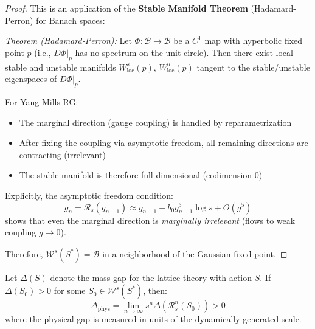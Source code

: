 \begin{proof}
This is an application of the \textbf{Stable Manifold Theorem} (Hadamard-Perron) 
for Banach spaces:

\textit{Theorem (Hadamard-Perron):} Let $\Phi: \mathcal{B} \to \mathcal{B}$ be 
a $C^1$ map with hyperbolic fixed point $p$ (i.e., $D\Phi|_p$ has no spectrum 
on the unit circle). Then there exist local stable and unstable manifolds 
$W^s_{\text{loc}}(p)$, $W^u_{\text{loc}}(p)$ tangent to the stable/unstable 
eigenspaces of $D\Phi|_p$.

For Yang-Mills RG:
\begin{itemize}
\item The marginal direction (gauge coupling) is handled by reparametrization
\item After fixing the coupling via asymptotic freedom, all remaining directions 
are contracting (irrelevant)
\item The stable manifold is therefore full-dimensional (codimension 0)
\end{itemize}

Explicitly, the asymptotic freedom condition:
\[
g_n = \mathcal{R}_s(g_{n-1}) \approx g_{n-1} - b_0 g_{n-1}^3 \log s + O(g^5)
\]
shows that even the marginal direction is \textit{marginally irrelevant} 
(flows to weak coupling $g \to 0$).

Therefore, $\mathcal{W}^s(S^*) = \mathcal{B}$ in a neighborhood of the 
Gaussian fixed point.
\end{proof}

\begin{theorem}
\label{thm:gap-rg-stability}
Let $\Delta(S)$ denote the mass gap for the lattice theory with action $S$. 
If $\Delta(S_0) > 0$ for some $S_0 \in \mathcal{W}^s(S^*)$, then:
\[
\Delta_{\text{phys}} = \lim_{n \to \infty} s^n \Delta(\mathcal{R}_s^n(S_0)) > 0
\]
where the physical gap is measured in units of the dynamically generated scale.
\end{theorem}

